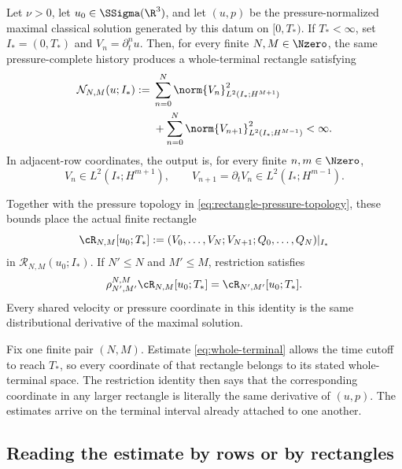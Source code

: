 \begin{theorem}
\label{thm:whole-terminal}
Let \(\nu>0\), let \(u_0\in\SSigma(\R^3)\), and let \((u,p)\) be the
pressure-normalized maximal classical solution generated by this datum on
\([0,T_*)\).  If \(T_*<\infty\), set \(I_*=(0,T_*)\) and
\(V_n=\partial_t^n u\).  Then, for every finite \(N,M\in\Nzero\), the
same pressure-complete history produces a whole-terminal rectangle satisfying
\begin{equation}
\begin{aligned}
 \mathcal N_{N,M}(u;I_*)
 :={}&\sum_{n=0}^{N}
 \norm{V_n}_{L^2(I_*;H^{M+1})}^2
 \\
 &+\sum_{n=0}^{N}
 \norm{V_{n+1}}_{L^2(I_*;H^{M-1})}^2
 <\infty.
\end{aligned}
 \label{eq:whole-terminal}
\end{equation}
In adjacent-row coordinates, the output is, for every finite \(n,m\in\Nzero\),
\begin{equation}
 V_n\in L^2(I_*;H^{m+1}),
 \qquad
 V_{n+1}=\partial_tV_n\in L^2(I_*;H^{m-1}).
 \label{eq:datum-adjacent-row}
\end{equation}

Together with the pressure topology in
\eqref{eq:rectangle-pressure-topology}, these bounds place the actual finite
rectangle
\begin{equation*}
 \cR_{N,M}[u_0;T_*]
 :=(V_0,\ldots,V_N;V_{N+1};Q_0,\ldots,Q_N)|_{I_*}
\end{equation*}
in \(\mathscr R_{N,M}(u_0;I_*)\).  If \(N'\le N\) and \(M'\le M\),
restriction satisfies
\begin{equation}
 \rho_{N',M'}^{N,M}\cR_{N,M}[u_0;T_*]
 =\cR_{N',M'}[u_0;T_*].
 \label{eq:restriction}
\end{equation}
Every shared velocity or pressure coordinate in this identity is the same
distributional derivative of the maximal solution.
\end{theorem}

Fix one finite pair \((N,M)\).  Estimate \eqref{eq:whole-terminal} allows the
time cutoff to reach \(T_*\), so every coordinate of that rectangle belongs
to its stated whole-terminal space.  The restriction identity then says that
the corresponding coordinate in any larger rectangle is literally the same
derivative of \((u,p)\).  The estimates arrive on the terminal
interval already attached to one another.

\subsection{Reading the estimate by rows or by rectangles}

